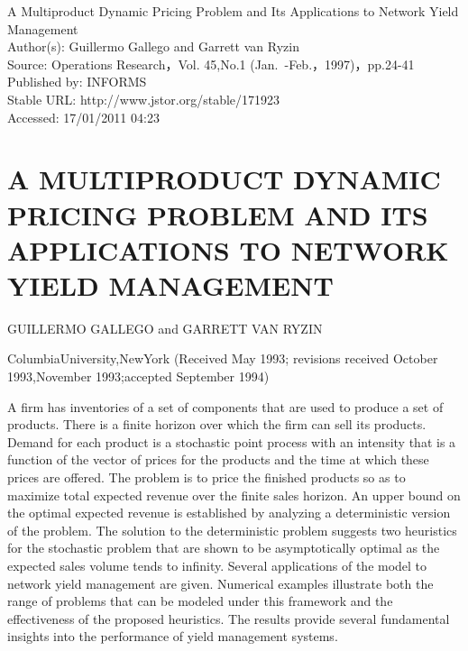 

A Multiproduct Dynamic Pricing Problem and Its Applications to Network Yield Management\\
Author(s): Guillermo Gallego and Garrett van Ryzin\\
Source: Operations Research，Vol. 45,No.1 (Jan.~-Feb.，1997)，pp.24-41\\
Published by: INFORMS\\
Stable URL: http://www.jstor.org/stable/171923\\
Accessed: 17/01/2011 04:23

\section{A MULTIPRODUCT DYNAMIC PRICING PROBLEM AND ITS APPLICATIONS TO NETWORK YIELD MANAGEMENT}\label{a-multiproduct-dynamic-pricing-problem-and-its-applications-to-network-yield-management}

GUILLERMO GALLEGO and GARRETT VAN RYZIN

ColumbiaUniversity,NewYork (Received May 1993; revisions received October 1993,November 1993;accepted September 1994)

A firm has inventories of a set of components that are used to produce a set of products. There is a finite horizon over which the firm can sell its products. Demand for each product is a stochastic point process with an intensity that is a function of the vector of prices for the products and the time at which these prices are offered. The problem is to price the finished products so as to maximize total expected revenue over the finite sales horizon. An upper bound on the optimal expected revenue is established by analyzing a deterministic version of the problem. The solution to the deterministic problem suggests two heuristics for the stochastic problem that are shown to be asymptotically optimal as the expected sales volume tends to infinity. Several applications of the model to network yield management are given. Numerical examples illustrate both the range of problems that can be modeled under this framework and the effectiveness of the proposed heuristics. The results provide several fundamental insights into the performance of yield management systems.

